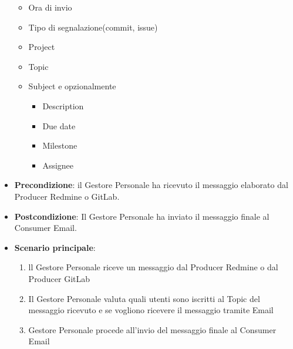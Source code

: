 \begin{itemize}
\begin{itemize}
			\item Ora di invio
			\item Tipo di segnalazione(commit, issue)
			\item Project
			\item Topic
			\item Subject e opzionalmente
		 	\begin{itemize}
				\item Description
				\item Due date
				\item Milestone
				\item Assignee
			\end{itemize}
		\end{itemize}
		\item \textbf{Precondizione}: il Gestore Personale ha ricevuto il messaggio elaborato dal Producer Redmine o GitLab.
		\item \textbf{Postcondizione}: Il Gestore Personale ha inviato il messaggio finale al Consumer Email.
		\item \textbf{Scenario principale}: 
		\begin{enumerate}
			\item ll Gestore Personale riceve un messaggio dal Producer Redmine o dal Producer GitLab
			\item Il Gestore Personale valuta quali utenti sono iscritti al Topic del messaggio ricevuto e se vogliono ricevere il messaggio tramite Email
			\item Gestore Personale procede all'invio del messaggio finale al Consumer Email
		\end{enumerate}
		
	\end{itemize}